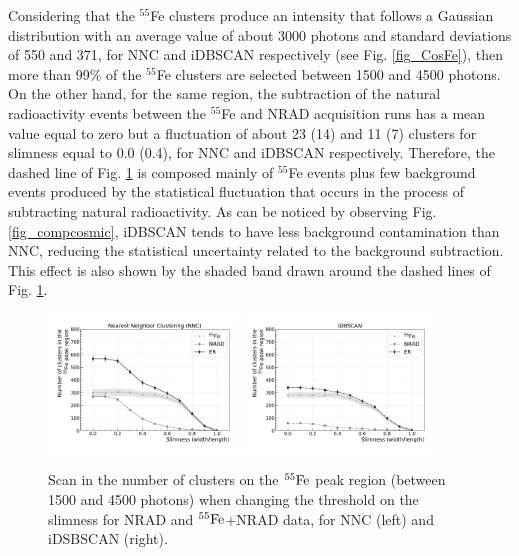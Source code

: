 \documentclass[a4paper,11pt]{article}
\begin{document}
Considering that the $^{55}$Fe clusters produce an intensity that follows a Gaussian distribution with an average value of about 3000 photons and standard deviations of 550 and 371, for NNC and iDBSCAN respectively (see Fig. \ref{fig_CosFe}), then more than 99\% of the $^{55}$Fe clusters are selected between 1500 and 4500 photons.
On the other hand, for the same region, the subtraction of the natural radioactivity events between the $^{55}$Fe and NRAD acquisition runs has a mean value equal to zero but a fluctuation of about 23 (14) and 11 (7) clusters for slimness equal to 0.0 (0.4), for NNC and iDBSCAN respectively. Therefore, the dashed line of Fig. \ref{fig_slim_scan} is composed mainly of $^{55}$Fe events plus few background events produced by the statistical fluctuation that occurs in the process of subtracting natural radioactivity.
As can be noticed by observing Fig. \ref{fig_compcosmic}, iDBSCAN tends to have less background contamination than NNC, reducing the statistical uncertainty related to the background subtraction. This effect is also shown by the shaded band drawn around the dashed lines of Fig. \ref{fig_slim_scan}.

\begin{figure}[ht]
\centering
\includegraphics[width=0.45\textwidth]{NNC_ScanSlim.pdf}
\includegraphics[width=0.45\textwidth]{I2DBSCAN_Scanslim.pdf}
\caption{Scan in the number of clusters on the $\rm ^{55}Fe$ peak region (between 1500 and 4500 photons) when changing the threshold on the slimness for NRAD and $\rm ^{55}Fe$+NRAD data, for NNC (left) and iDSBSCAN (right).} 
\label{fig_slim_scan}
\end{figure}
\end{document}
